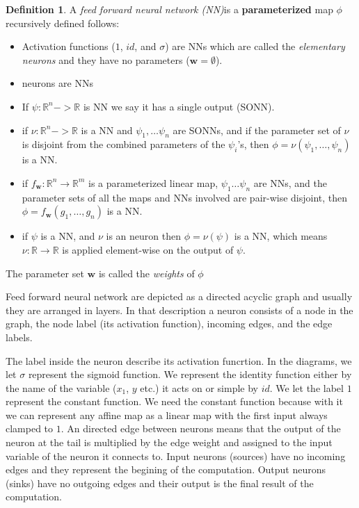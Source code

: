 \documentclass[11pt, a4paper]{report}
\theoremstyle{plain}
\theoremstyle{definition}
\newtheorem{mydef}{Definition}[chapter]
\theoremstyle{remark}
\newcommand{\R}{\mathbb{R}}
\newcommand{\w}{\mathbf{w}}
\begin{document}
\begin{mydef}
\label{def:NN}
A \emph{feed forward neural network (NN)}is a \textbf{parameterized} map $\phi$
recursively defined
follows:
\begin{itemize}
\item{} 
Activation functions ($1$, $id$, and $\sigma$) are NNs which are called the
\emph{elementary neurons} and they have no parameters ($\w=\emptyset$).
\item{} neurons are NNs
\item{} If $\psi :\R^n -> \R$ is NN we say it has a single output (SONN).
\item{} if $\nu:\R^n->\R$ is a NN and $\psi_1, \dots \psi_n$ are SONNs,
and if the parameter set of $\nu$ is disjoint from the combined parameters of
the $\psi_i$'s, then
$\phi = \nu(\psi_1, \dots, \psi_n)$ is a NN.
\item{}
if $f_{\w}:\R^n \to \R^m$ is a parameterized linear map,  
$\psi_1 \dots \psi_n$ are
NNs, and the parameter sets of all the maps and NNs involved are pair-wise
disjoint,
then $\phi = f_{\w}(g_1, \dots , g_n)$ is a NN.
\item{}
if $\psi$ is a NN, and $\nu$ is an neuron then $\phi = \nu(\psi)$ is a NN, which
means $\nu:\R \to \R$ is applied
element-wise on the output of $\psi$.
\end{itemize}

The parameter set $\w$ is called the \emph{weights} of $\phi$
\end{mydef}
Feed forward neural network 
are depicted as a directed acyclic graph and usually they are arranged in
layers. In that description a neuron consists of a node in the graph, 
the node label (its activation function),
incoming edges, and the edge labels.


The label inside the neuron describe its activation funcrtion.
In the diagrams, we let $\sigma$ represent the sigmoid function.
We represent the identity function either by the name of the variable ($x_1$,
$y$ etc.) it acts on or simple by 
$id$.   We let the label $1$ represent the constant function. We need the
constant function because with it we can represent any affine map as a linear
map with the first input always clamped to $1$.
An directed edge between neurons means that the output of the neuron at the tail
is multiplied by the edge weight and assigned to the input variable of the
neuron it connects to.
Input neurons (sources) have no incoming edges and they represent the begining of the
computation.
Output neurons (sinks) have no outgoing edges and their output is the final result of
the computation.
\end{document}
